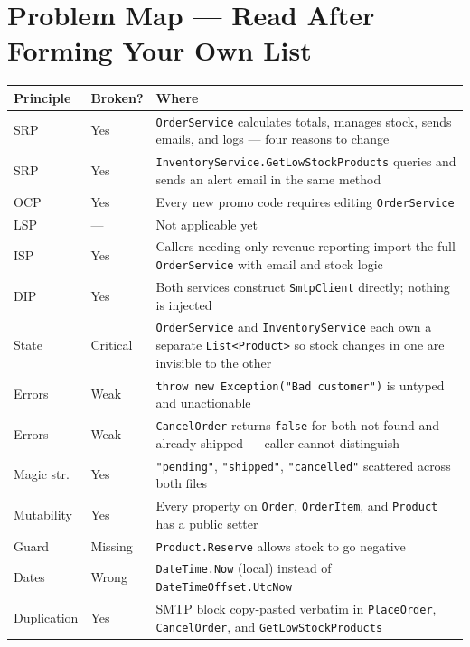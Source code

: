 \documentclass[11pt,a4paper]{article}
\begin{document}
\newpage
\section{Problem Map --- Read After Forming Your Own List}

\begin{center}
\begin{tabularx}{\textwidth}{llX}
\toprule
\textbf{Principle} & \textbf{Broken?} & \textbf{Where} \\
\midrule
SRP & Yes & \texttt{OrderService} calculates totals, manages stock,
            sends emails, and logs --- four reasons to change \\
SRP & Yes & \texttt{InventoryService.GetLowStockProducts} queries
            and sends an alert email in the same method \\
OCP & Yes & Every new promo code requires editing \texttt{OrderService} \\
LSP & ---  & Not applicable yet \\
ISP & Yes & Callers needing only revenue reporting import
            the full \texttt{OrderService} with email and stock logic \\
DIP & Yes & Both services construct \texttt{SmtpClient} directly;
            nothing is injected \\
\midrule
State       & Critical & \texttt{OrderService} and \texttt{InventoryService}
                         each own a separate \texttt{List<Product>} so
                         stock changes in one are invisible to the other \\
Errors      & Weak     & \texttt{throw new Exception("Bad customer")} is
                         untyped and unactionable \\
Errors      & Weak     & \texttt{CancelOrder} returns \texttt{false} for
                         both not-found and already-shipped ---
                         caller cannot distinguish \\
Magic str.  & Yes      & \texttt{"pending"}, \texttt{"shipped"},
                         \texttt{"cancelled"} scattered across both files \\
Mutability  & Yes      & Every property on \texttt{Order}, \texttt{OrderItem},
                         and \texttt{Product} has a public setter \\
Guard       & Missing  & \texttt{Product.Reserve} allows stock to go negative \\
Dates       & Wrong    & \texttt{DateTime.Now} (local) instead of
                         \texttt{DateTimeOffset.UtcNow} \\
Duplication & Yes      & SMTP block copy-pasted verbatim in
                         \texttt{PlaceOrder}, \texttt{CancelOrder},
                         and \texttt{GetLowStockProducts} \\
\bottomrule
\end{tabularx}
\end{center}
\end{document}
